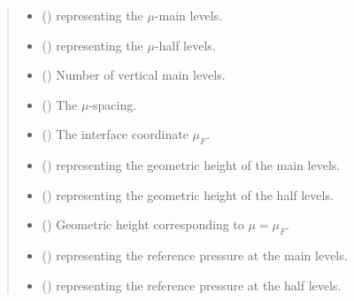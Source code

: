 \documentclass[letterpaper,10pt,english]{sphinxmanual}
\begin{document}
\begin{fulllineitems}
\begin{quote}
\begin{description}
\begin{itemize}
\item {} 
 () \textendash{} {\hyperref[\detokenize{api:tasmania.grids.axis.Axis}]{}} representing the \(\mu\)-main levels.

\item {} 
 () \textendash{} {\hyperref[\detokenize{api:tasmania.grids.axis.Axis}]{}} representing the \(\mu\)-half levels.

\item {} 
 () \textendash{} Number of vertical main levels.

\item {} 
 () \textendash{} The \(\mu\)-spacing.

\item {} 
 () \textendash{} The interface coordinate \(\mu_F\).

\item {} 
 () \textendash{}  representing the geometric height of the main levels.

\item {} 
 () \textendash{}  representing the geometric height of the half levels.

\item {} 
 () \textendash{} Geometric height corresponding to \(\mu = \mu_F\).

\item {} 
 () \textendash{}  representing the reference pressure at the main levels.

\item {} 
 () \textendash{}  representing the reference pressure at the half levels.


\end{itemize}
\end{description}
\end{quote}
\end{fulllineitems}
\end{document}
